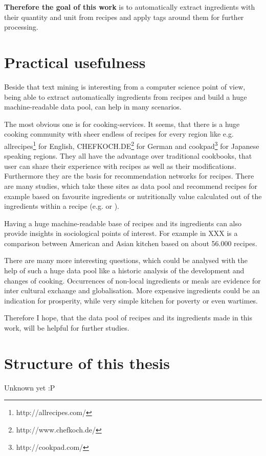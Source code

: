 \documentclass[12pt, twoside]{report}
\begin{document}
\textbf{Therefore the goal of this work} is to automatically extract ingredients with their quantity and unit from recipes and apply tags around them for further processing.


\section{Practical usefulness}
Beside that text mining is interesting from a computer science point of view, being able to extract automatically ingredients from recipes and build a huge machine-readable data pool, can help in many scenarios.

The most obvious one is for cooking-services. It seems, that there is a huge cooking community with sheer endless of recipes for every region like e.g. allrecipes\footnote{http://allrecipes.com/} for English, CHEFKOCH.DE\footnote{http://www.chefkoch.de/} for German and cookpad\footnote{http://cookpad.com/} for Japanese speaking regions. They all have the advantage over traditional cookbooks, that user can share their experience with recipes as well as their modifications. Furthermore they are the basis for recommendation networks for recipes. There are many studies, which take these sites as data pool and recommend recipes for example based on favourite ingredients or nutritionally value calculated out of the ingredients within a recipe (e.g. \cite{ingredientNetworks} or \cite{recipeRecommendation}).

Having a huge machine-readable base of recipes and its ingredients can also provide insights in sociological points of interest. For example in XXX is a comparison between American and Asian kitchen based on about 56.000 recipes.

There are many more interesting questions, which could be analysed with the help of such a huge data pool like a historic analysis of the development and changes of cooking. Occurrences of non-local ingredients or meals are evidence for inter cultural exchange and globalisation. More expensive ingredients could be an indication for prosperity, while very simple kitchen for poverty or even wartimes.

Therefore I hope, that the data pool of recipes and its ingredients made in this work, will be helpful for further studies.

\section{Structure of this thesis}
Unknown yet :P
\end{document}
